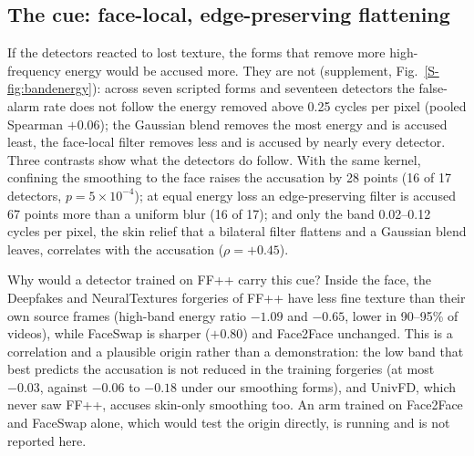 \documentclass[conference]{IEEEtran}
\begin{document}
\subsection{The cue: face-local, edge-preserving flattening}
\label{sec:signature}

If the detectors reacted to lost texture, the forms that remove more high-frequency energy would be accused more. They are
not (supplement, Fig.~\ref{S-fig:bandenergy}): across seven scripted forms and seventeen detectors the false-alarm rate does not follow the
energy removed above 0.25 cycles per pixel (pooled Spearman $+0.06$);
the Gaussian blend removes the most energy and is accused least, the face-local filter removes less and is accused by
nearly every detector. Three contrasts show what the detectors do follow. With the same kernel, confining the smoothing to
the face raises the accusation by 28 points (16 of 17 detectors, $p=5\times10^{-4}$); at equal energy loss an
edge-preserving filter is accused 67 points more than a uniform blur (16 of 17); and only the band 0.02--0.12 cycles per
pixel, the skin relief that a bilateral filter flattens and a Gaussian blend leaves, correlates with the accusation
($\rho=+0.45$).

Why would a detector trained on FF++ carry this cue? Inside the face, the Deepfakes and NeuralTextures forgeries of FF++
have less fine texture than their own source frames (high-band energy ratio $-1.09$ and $-0.65$, lower in 90--95\% of
videos), while FaceSwap is sharper ($+0.80$) and Face2Face unchanged.
This is a correlation and a plausible origin rather than a demonstration: the low band that best predicts the accusation is not
reduced in the training forgeries (at most $-0.03$, against $-0.06$ to $-0.18$ under our smoothing forms),
and UnivFD, which never saw FF++, accuses skin-only smoothing too. An arm trained on Face2Face and FaceSwap alone, which
would test the origin directly, is running and is not reported here.
\end{document}
